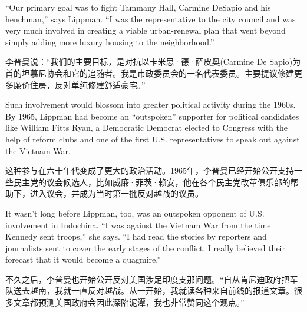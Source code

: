 \ifdefined\eng
``Our primary goal was to fight Tammany Hall, Carmine DeSapio and his henchman,'' says Lippman. ``I was the representative to the city council and was very much involved in creating a viable urban-renewal plan that went beyond simply adding more luxury housing to the neighborhood.''
\fi

\ifdefined\chs
李普曼说：``我们的主要目标，是对抗以卡米思·德·萨皮奥(Carmine De Sapio)为首的坦慕尼协会和它的追随者。我是市政委员会的一名代表委员。主要提议修建更多廉价住房，反对单纯修建舒适豪宅。''
\fi

\ifdefined\eng
Such involvement would blossom into greater political activity during the 1960s. By 1965, Lippman had become an ``outspoken'' supporter for political candidates like William Fitts Ryan, a \ifdefined\vone Democratic \fi\ifdefined\vtwo Democrat \fi elected to Congress with the help of reform clubs and one of the first U.S. representatives to speak out against the Vietnam War.
\fi

\ifdefined\chs
这种参与在六十年代变成了更大的政治活动。1965年，李普曼已经开始公开支持一些民主党的议会候选人，比如威廉·菲茨·赖安，他在各个民主党改革俱乐部的帮助下，进入议会，并成为当时第一批反对越战的议员。
\fi

\ifdefined\eng
It wasn't long before Lippman, too, was an outspoken opponent of U.S. involvement in Indochina. ``I was against the Vietnam War from the time Kennedy sent troops,'' she says. ``I had read the stories by reporters and journalists sent to cover the early stages of the conflict. I really believed their forecast that it would become a quagmire.''
\fi

\ifdefined\chs
不久之后，李普曼也开始公开反对美国涉足印度支那问题。``自从肯尼迪政府把军队送去越南，我就一直反对越战。从一开始，我就读各种来自前线的报道文章。很多文章都预测美国政府会因此深陷泥潭，我也非常赞同这个观点。''
\fi

